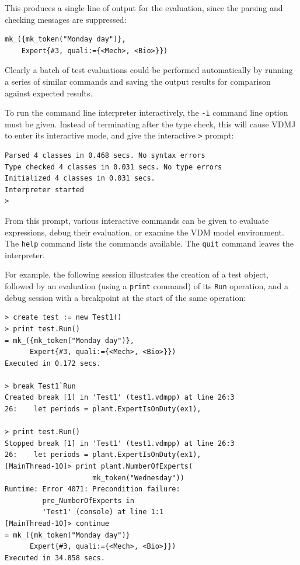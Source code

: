 \noindent This produces a single line of output for the evaluation, since the
parsing and checking messages are suppressed:

\begin{lstlisting}
mk_({mk_token("Monday day")},
	Expert{#3, quali:={<Mech>, <Bio>}})
\end{lstlisting}

Clearly a batch of test evaluations could be performed automatically by running
a series of similar commands and saving the output results for comparison
against expected results.

To run the command line interpreter interactively, the \verb|-i| command line
option must be given. Instead of terminating after the type check, this will
cause VDMJ to enter its interactive mode, and give the interactive \verb|>|
prompt:

\begin{lstlisting}
Parsed 4 classes in 0.468 secs. No syntax errors
Type checked 4 classes in 0.031 secs. No type errors
Initialized 4 classes in 0.031 secs. 
Interpreter started
>  
\end{lstlisting}

\noindent From this prompt, various interactive commands can be given to
evaluate expressions, debug their evaluation, or examine the VDM model environment.
The \verb|help| command lists the commands available. The \verb|quit| command
leaves the interpreter.

For example, the following session illustrates the creation of a test object,
followed by an evaluation (using a \texttt{print} command)
of its \verb|Run| operation, and a debug
session with a breakpoint at the start of the same operation:

\begin{lstlisting}
> create test := new Test1()
> print test.Run()
= mk_({mk_token("Monday day")}, 
      Expert{#3, quali:={<Mech>, <Bio>}})
Executed in 0.172 secs.

> break Test1`Run
Created break [1] in 'Test1' (test1.vdmpp) at line 26:3
26:    let periods = plant.ExpertIsOnDuty(ex1),

> print test.Run()
Stopped break [1] in 'Test1' (test1.vdmpp) at line 26:3
26:    let periods = plant.ExpertIsOnDuty(ex1),
[MainThread-10]> print plant.NumberOfExperts(
                     mk_token("Wednesday"))
Runtime: Error 4071: Precondition failure: 
         pre_NumberOfExperts in 
         'Test1' (console) at line 1:1
[MainThread-10]> continue
= mk_({mk_token("Monday day")}
      Expert{#3, quali:={<Mech>, <Bio>}})
Executed in 34.858 secs. 
\end{lstlisting}

